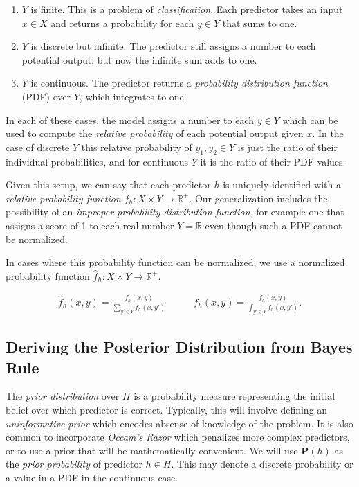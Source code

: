\documentclass[twoside]{article}
\begin{document}
\begin{enumerate}
	\item \(Y\) is finite. This is a problem of \textit{classification}. Each predictor takes an input \(x \in X\) and returns a probability for each \(y \in Y\) that sums to one.
	\item \(Y\) is discrete but infinite. The predictor still assigns a number to each potential output, but now the infinite sum adds to one.
	\item \(Y\) is continuous. The predictor returns a \textit{probability distribution function} (PDF) over \(Y\), which integrates to one.
\end{enumerate}

In each of these cases, the model assigns a number to each \(y \in Y\) which can be used to compute the \textit{relative probability} of each potential output given \(x\). In the case of discrete \(Y\) this relative probability of \(y_1, y_2 \in Y\) is just the ratio of their individual probabilities, and for continuous \(Y\) it is the ratio of their PDF values. 

Given this setup, we can say that each predictor \(h\) is uniquely identified with a \textit{relative probability function} \(f_h: X \times Y \rightarrow \mathbb{R}^+\). Our generalization includes the possibility of an \textit{improper probability distribution function}, for example one that assigns a score of 1 to each real number \(Y=\mathbb{R}\) even though such a PDF cannot be normalized.

In cases where this probability function can be normalized, we use a normalized probability function \(\hat{f}_h: X \times Y \rightarrow \mathbb{R}^+\).

\begin{align}
\label{eq:normalized_probability_model}
\hat{f}_h(x, y)=\frac{f_h(x, y)}{\sum_{y' \in Y} f_h(x,y')} &
\qquad\hat{f}_h(x, y)=\frac{f_h(x, y)}{\int_{y' \in Y} f_h(x,y')}.
\end{align}

\subsection{Deriving the Posterior Distribution from Bayes Rule}

The \textit{prior distribution} over \(H\) is a probability measure representing the initial belief over which predictor is correct. Typically, this will involve defining an \textit{uninformative prior} which encodes absense of knowledge of the problem. It is also common to incorporate \textit{Occam's Razor} which penalizes more complex predictors, or to use a prior that will be mathematically convenient. We will use \(\mathbf{P}(h)\) as the \textit{prior probability} of predictor \(h \in H\). This may denote a discrete probability or a value in a PDF in the continuous case.
\end{document}
